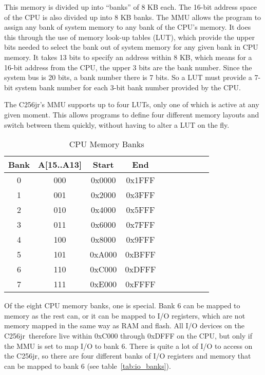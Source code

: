 \documentclass[oneside]{book}
\newcommand{\junior}{{\sc C256jr}}
\begin{document}
This memory is divided up into ``banks'' of 8 KB each. The 16-bit address space of the CPU is also divided up into 8 KB banks. The MMU allows the program to assign any bank of system memory to any bank of the CPU's memory. It does this through the use of memory look-up tables (LUT), which provide the upper bits needed to select the bank out of system memory for any given bank in CPU memory. It takes 13 bits to specify an address within 8 KB, which means for a 16-bit address from the CPU, the upper 3 bits are the bank number. Since the system bus is 20 bits, a bank number there is 7 bits. So a LUT must provide a 7-bit system bank number for each 3-bit bank number provided by the CPU.

The \junior's MMU supports up to four LUTs, only one of which is active at any given moment. This allows programs to define four different memory layouts and switch between them quickly, without having to alter a LUT on the fly.

\begin{table}
	\begin{center}
		\begin{tabular}{| c | c || c | c | c | c | c | c | c | c |} \hline
			Bank & A[15..A13] & Start & End \\ \hline\hline
			0 & 000 & 0x0000 & 0x1FFF \\ \hline
			1 & 001 & 0x2000 & 0x3FFF \\ \hline
			2 & 010 & 0x4000 & 0x5FFF \\ \hline
			3 & 011 & 0x6000 & 0x7FFF \\ \hline
			4 & 100 & 0x8000 & 0x9FFF \\ \hline
			5 & 101 & 0xA000 & 0xBFFF \\ \hline
			6 & 110 & 0xC000 & 0xDFFF \\ \hline
			7 & 111 & 0xE000 & 0xFFFF \\ \hline
		\end{tabular}
	\end{center}
	\caption{CPU Memory Banks}
	\label{tab:mem_banks}
\end{table}

Of the eight CPU memory banks, one is special. Bank 6 can be mapped to memory as the rest can, or it can be mapped to I/O registers, which are not memory mapped in the same way as RAM and flash. All I/O devices on the \junior\ therefore live within 0xC000 through 0xDFFF on the CPU, but only if the MMU is set to map I/O to bank 6. There is quite a lot of I/O to access on the \junior, so there are four different banks of I/O registers and memory that can be mapped to bank 6 (see table~\ref{tab:io_banks}).
\end{document}
